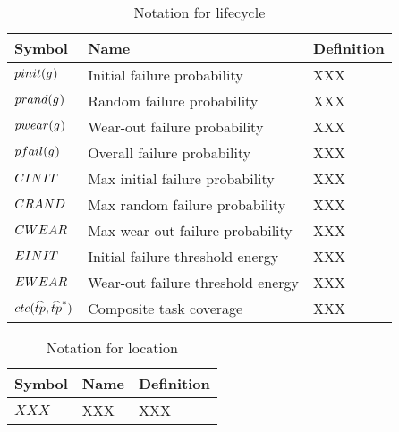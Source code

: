 \begin{table}[pos=htp]
	\begin{tabular}{|p{}|p{}|p{}|}
		\hline
		Symbol & Name & Definition \\
		\hline
		$\functionProbabilityInit{}{}$ & Initial failure probability & XXX \\
		$\functionProbabilityRand{}{}$ & Random failure probability & XXX \\
		$\functionProbabilityWear{}{}$ & Wear-out failure probability & XXX \\
		$\functionProbabilityFail{}{}$ & Overall failure probability & XXX \\
		${C}{INIT}^{}$ & Max initial failure probability & XXX \\
		${C}{RAND}^{}$ & Max random failure probability & XXX \\
		${C}{WEAR}^{}$ & Max wear-out failure probability & XXX \\
		${E}{INIT}^{}$ & Initial failure threshold energy & XXX \\
		${E}{WEAR}^{}$ & Wear-out failure threshold energy & XXX \\
		$\functionCompositeTaskCoverage{}{}$ & Composite task coverage & XXX \\
		\hline
	\end{tabular}
	\caption{Notation for lifecycle}
\end{table}

\begin{table}[pos=htp]
	\begin{tabular}{|p{}|p{}|p{}|}
		\hline
		Symbol & Name & Definition \\
		\hline
		$XXX$ & XXX & XXX \\
		\hline
	\end{tabular}
	\caption{Notation for location}
\end{table}